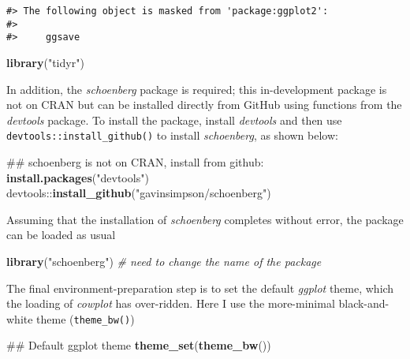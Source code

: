 \documentclass[12pt,]{article}
\newenvironment{Shaded}{\begin{snugshade}}{\end{snugshade}}
\newcommand{\KeywordTok}[1]{\textcolor[rgb]{0.13,0.29,0.53}{\textbf{{#1}}}}
\newcommand{\StringTok}[1]{\textcolor[rgb]{0.31,0.60,0.02}{{#1}}}
\newcommand{\CommentTok}[1]{\textcolor[rgb]{0.56,0.35,0.01}{\textit{{#1}}}}
\newcommand{\NormalTok}[1]{{#1}}
\begin{document}
\begin{verbatim}
#> The following object is masked from 'package:ggplot2':
#> 
#>     ggsave
\end{verbatim}

\begin{Shaded}
\begin{Highlighting}[]
\KeywordTok{library}\NormalTok{(}\StringTok{"tidyr"}\NormalTok{)}
\end{Highlighting}
\end{Shaded}

In addition, the \emph{schoenberg} package is required; this
in-development package is not on CRAN but can be installed directly from
GitHub using functions from the \emph{devtools} package. To install the
package, install \emph{devtools} and then use
\texttt{devtools::install\_github()} to install \emph{schoenberg}, as
shown below:

\begin{Shaded}
\begin{Highlighting}[]
\NormalTok{## schoenberg is not on CRAN, install from github:}
\KeywordTok{install.packages}\NormalTok{(}\StringTok{"devtools"}\NormalTok{)}
\NormalTok{devtools::}\KeywordTok{install_github}\NormalTok{(}\StringTok{"gavinsimpson/schoenberg"}\NormalTok{)}
\end{Highlighting}
\end{Shaded}

Assuming that the installation of \emph{schoenberg} completes without
error, the package can be loaded as usual

\begin{Shaded}
\begin{Highlighting}[]
\KeywordTok{library}\NormalTok{(}\StringTok{"schoenberg"}\NormalTok{) }\CommentTok{# need to change the name of the package}
\end{Highlighting}
\end{Shaded}

The final environment-preparation step is to set the default
\emph{ggplot} theme, which the loading of \emph{cowplot} has
over-ridden. Here I use the more-minimal black-and-white theme
(\texttt{theme\_bw()})

\begin{Shaded}
\begin{Highlighting}[]
\NormalTok{## Default ggplot theme}
\KeywordTok{theme_set}\NormalTok{(}\KeywordTok{theme_bw}\NormalTok{())}
\end{Highlighting}
\end{Shaded}
\end{document}

